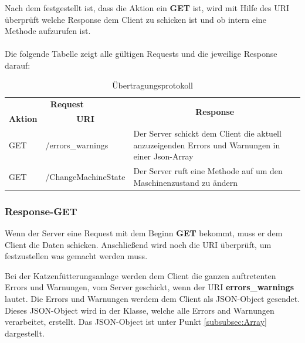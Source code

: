 \vspace{10pt}

Nach dem festgestellt ist, dass die Aktion ein \textbf{GET} ist, wird mit Hilfe des URI überprüft welche Response dem Client zu schicken ist und ob intern eine Methode aufzurufen ist.
\\ \\
Die folgende Tabelle zeigt alle gültigen Requests und die jeweilige Response darauf:

\begin{table}[htb]
\centering
\begin{tabular}{|l|l|p{290pt}|}
\hline
\multicolumn{2}{|c|}{\textbf{Request}}                                    & \multicolumn{1}{c|}{\multirow{2}{*}{\textbf{Response}}}                                          \\ \cline{1-2}
\multicolumn{1}{|c|}{\textbf{Aktion}} & \multicolumn{1}{c|}{\textbf{\ac{URI}}} & \multicolumn{1}{c|}{}                                                                            \\ \hline
GET                                   & /errors\_warnings                 & Der Server schickt dem Client die aktuell anzuzeigenden Errors und Warnungen in einer Json-Array \\ \hline
GET                                   & /ChangeMachineState               & Der Server ruft eine Methode auf um den Maschinenzustand zu ändern                               \\ \hline
\end{tabular}
\caption{Übertragungsprotokoll}
\label{Übertragungsprotokoll}
\end{table}

\subsubsection{Response-GET}
Wenn der Server eine Request mit dem Beginn \textbf{GET} bekommt, muss er dem Client die Daten schicken. Anschließend wird noch die URI überprüft, um festzustellen was gemacht werden muss.

\vspace{10pt}

Bei der Katzenfütterungsanlage werden dem Client die ganzen auftretenten Errors und Warnungen, vom Server geschickt, wenn der URI \textbf{errors\_warnings} lautet. Die Errors und Warnungen werdem dem Client als \ac{JSON}-Object gesendet. Dieses \ac{JSON}-Object wird in der Klasse, welche alle Errors and Warnungen verarbeitet, erstellt. Das \ac{JSON}-Object ist unter Punkt \ref{subsubsec:Array} dargestellt. 

